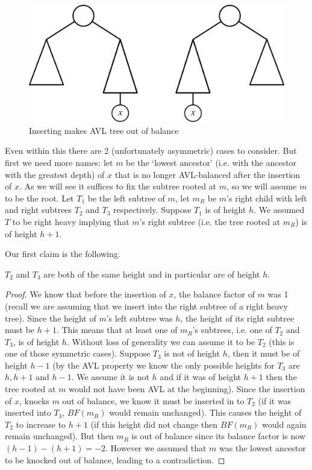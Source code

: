 \begin{figure}[h]
    \centering
    \includegraphics[scale=0.7]{Images/avl_insert_out_of_balance.png}
    \caption{Inserting makes AVL tree out of balance}
    \label{fig:oob_avl_tree}
\end{figure}

Even within this there are 2 (unfortunately asymmetric) cases to consider. But first we need more names: let $m$ be the `lowest ancestor' (i.e. with the ancestor with the greatest depth) of $x$ that is no longer AVL-balanced after the insertion of $x$. As we will see it suffices to fix the subtree rooted at $m$, so we will assume $m$ to be the root. Let $T_1$ be the left subtree of $m$, let $m_R$ be $m$'s right child with left and right subtrees $T_2$ and $T_3$ respectively. Suppose $T_1$ is of height $h$. We assumed $T$ to be right heavy implying that $m$'s right subtree (i.e. the tree rooted at $m_R$) is of height $h + 1$. 

Our first claim is the following.
\begin{lemma}
    $T_2$ and $T_3$ are both of the same height and in particular are of height $h$.
\end{lemma}
\begin{proof}
    We know that before the insertion of $x$, the balance factor of $m$ was 1 (recall we are assuming that we insert into the right subtree of a right heavy tree). Since the height of $m$'s left subtree was $h$, the height of its right subtree must be $h + 1$. This means that at least one of $m_R$'s subtrees, i.e. one of $T_2$ and $T_3$, is of height $h$. Without loss of generality we can assume it to be $T_2$ (this is one of those symmetric cases). Suppose $T_3$ is not of height $h$, then it must be of height $h - 1$ (by the AVL property we know the only possible heights for $T_3$ are $h, h + 1$ and $h - 1$. We assume it is not $h$ and if it was of height $h + 1$ then the tree rooted at $m$ would not have been AVL at the beginning). Since the insertion of $x$, knocks $m$ out of balance, we know it must be inserted in to $T_2$ (if it was inserted into $T_3$, $BF(m_R)$ would remain unchanged). This causes the height of $T_2$ to increase to $h + 1$ (if this height did not change then $BF(m_R)$ would again remain unchanged). But then $m_R$ is out of balance since its balance factor is now $(h - 1) - (h + 1) = -2$. However we assumed that $m$ was the lowest ancestor to be knocked out of balance, leading to a contradiction.
\end{proof}

